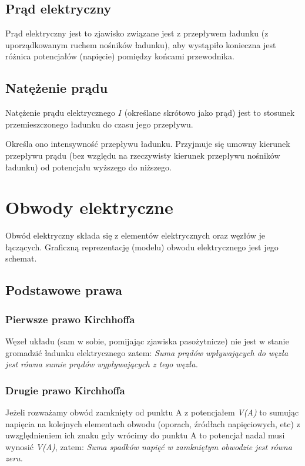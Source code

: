 \subsection{Prąd elektryczny}

Prąd elektryczny
jest to zjawisko związane jest z przepływem ładunku (z uporządkowanym ruchem nośników ładunku), aby wystąpiło konieczna jest różnica potencjałów (napięcie) pomiędzy końcami przewodnika.

\subsection{Natężenie prądu}

Natężenie prądu elektrycznego $I$ (określane skrótowo jako prąd)
jest to stosunek przemieszczonego ładunku do czasu jego przepływu.

Określa ono intensywność przepływu ładunku. Przyjmuje się umowny kierunek przepływu prądu (bez względu na rzeczywisty kierunek przepływu nośników ładunku) od potencjału wyższego do niższego.


\section{Obwody elektryczne}

Obwód elektryczny składa się z elementów elektrycznych oraz węzłów je łączących. Graficzną reprezentację (modelu) obwodu elektrycznego jest jego schemat.

\subsection{Podstawowe prawa}

\subsubsection{Pierwsze prawo Kirchhoffa}

Węzeł układu (sam w sobie, pomijając zjawiska pasożytnicze) nie jest w stanie gromadzić ładunku elektrycznego zatem:
	\textit{Suma prądów wpływających do węzła jest równa sumie prądów wypływających z tego węzła.}

\subsubsection{Drugie prawo Kirchhoffa}

Jeżeli rozważamy obwód zamknięty od punktu A z potencjałem \textit{V(A)} to sumując napięcia na kolejnych elementach obwodu (oporach, źródłach napięciowych, etc) z uwzględnieniem ich znaku gdy wrócimy do punktu A to potencjał nadal musi wynosić \textit{V(A)}, zatem:
	\textit{Suma spadków napięć w zamkniętym obwodzie jest równa zeru.}

